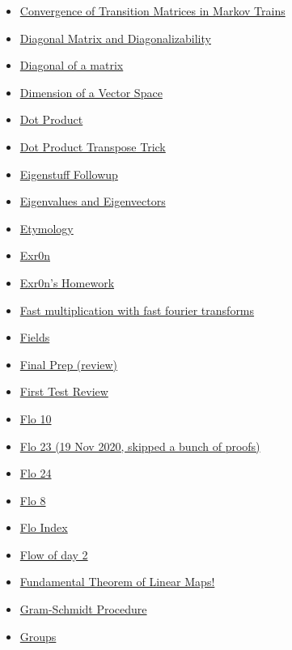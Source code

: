 \documentclass[11pt]{article}
\begin{document}
\begin{itemize}
\begin{itemize}
\item \href{math530/ConvergenceOfMarkovTransitionMatrices.org}{Convergence of Transition Matrices in Markov Trains}
\item \href{math530/KBrefDiagonalMatrix.org}{Diagonal Matrix and Diagonalizability}
\item \href{math530/KBrefDiagonalOfAMatrix.org}{Diagonal of a matrix}
\item \href{math530/KBrefDimension.org}{Dimension of a Vector Space}
\item \href{math530/KBrefDotProduct.org}{Dot Product}
\item \href{math530/KBrefDotProductTranspose.org}{Dot Product Transpose Trick}
\item \href{math530/KBe21math530retEigenstuffFollowup.org}{Eigenstuff Followup}
\item \href{math530/KBrefEigenvaluesAndEigenVectors.org}{Eigenvalues and Eigenvectors}
\item \href{math530/KBe2020math530floLinalgEtymology.org}{Etymology}
\item \href{math530/KBe20math530flo12.org}{Exr0n}
\item \href{math530/KBe2020math530refExr0nRetIndex.org}{Exr0n's Homework}
\item \href{math530/KBe21math530floFastMultiplicationWithFFT.org}{Fast multiplication with fast fourier transforms}
\item \href{math530/KBe20math530refField.org}{Fields}
\item \href{math530/KBe20math530refFallFinalPrep.org}{Final Prep (review)}
\item \href{math530/KBxFirstTestReview.org}{First Test Review}
\item \href{math530/KBe20math530flo10.org}{Flo 10}
\item \href{math530/KBe20math530flo23.org}{Flo 23 (19 Nov 2020, skipped a bunch of proofs)}
\item \href{math530/KBe20math530flo24.org}{Flo 24}
\item \href{math530/Kbe20math530flo8.org}{Flo 8}
\item \href{math530/KBe2020math530floIndex.org}{Flo Index}
\item \href{math530/KBe2020math530flo2.org}{Flow of day 2}
\item \href{math530/KBrefFundamentalTheoremOfLinearMaps.org}{Fundamental Theorem of Linear Maps!}
\item \href{math530/KBrefGramSchmidtProcedure.org}{Gram-Schmidt Procedure}
\item \href{math530/KBe2020math530refGroups.org}{Groups}

\end{itemize}
\end{itemize}
\end{document}
